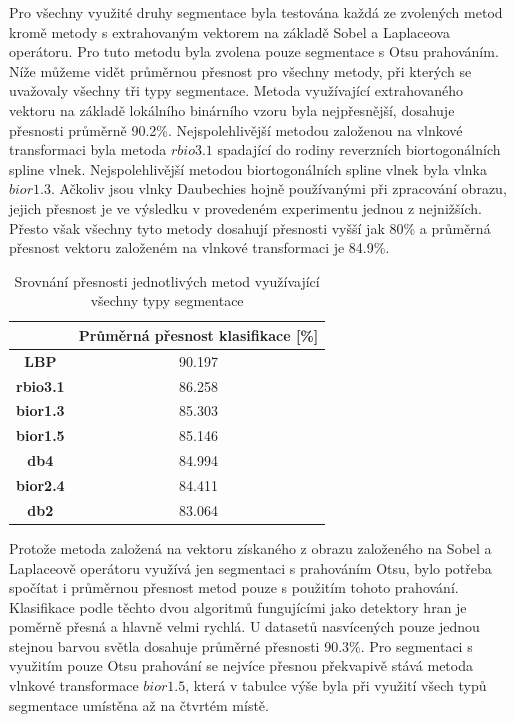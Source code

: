  Pro všechny využité druhy segmentace byla testována každá ze zvolených metod kromě metody s extrahovaným vektorem na základě Sobel a Laplaceova operátoru. Pro tuto metodu byla zvolena pouze segmentace s Otsu prahováním. Níže můžeme vidět průměrnou přesnost pro všechny metody, při kterých se uvažovaly všechny tři typy segmentace. Metoda využívající extrahovaného vektoru na základě lokálního binárního vzoru byla nejpřesnější, dosahuje přesnosti průměrně 90.2\%. Nejspolehlivější metodou založenou na vlnkové transformaci byla metoda $rbio3.1$ spadající do rodiny reverzních biortogonálních spline vlnek. Nejspolehlivější metodou biortogonálních spline vlnek byla vlnka $bior1.3$. Ačkoliv jsou vlnky Daubechies hojně používanými při zpracování obrazu, jejich přesnost je ve výsledku v provedeném experimentu jednou z nejnižších. Přesto však všechny tyto metody dosahují přesnosti vyšší jak 80\% a průměrná přesnost vektoru založeném na vlnkové transformaci je 84.9\%.
 
\capstartfalse
\begin{table}[!htbp]
\centering
\begin{tabular}{|c|c|}
\hline
                 & \textbf{Průměrná přesnost klasifikace {[}\%{]}} \\ \hline
\textbf{LBP}     & 90.197                                         \\ \hline
\textbf{rbio3.1} & 86.258                                         \\ \hline
\textbf{bior1.3} & 85.303                                         \\ \hline
\textbf{bior1.5} & 85.146                                         \\ \hline
\textbf{db4}     & 84.994                                         \\ \hline
\textbf{bior2.4} & 84.411                                         \\ \hline
\textbf{db2}     & 83.064                                         \\ \hline
\end{tabular}
\caption{Srovnání přesnosti jednotlivých metod využívající všechny typy segmentace}
\end{table}
\capstarttrue

Protože metoda založená na vektoru získaného z obrazu založeného na Sobel a Laplaceově operátoru využívá jen segmentaci s prahováním Otsu, bylo potřeba spočítat i průměrnou přesnost metod pouze s použitím tohoto prahování. Klasifikace podle těchto dvou algoritmů fungujícími jako detektory hran je poměrně přesná a hlavně velmi rychlá. U datasetů nasvícených pouze jednou stejnou barvou světla dosahuje průměrné přesnosti 90.3\%. Pro segmentaci s využitím pouze Otsu prahování se nejvíce přesnou překvapivě stává metoda vlnkové transformace $bior1.5$, která v tabulce výše byla při využití všech typů segmentace umístěna až na čtvrtém místě.


